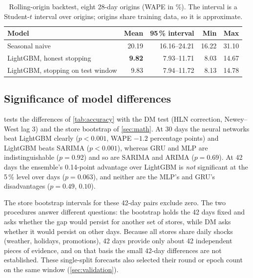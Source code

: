 \documentclass[conference]{IEEEtran}
\begin{document}
\begin{table}[t]
\centering
\caption{Rolling-origin backtest, eight 28-day origins (WAPE in \%). The interval is a Student-$t$
interval over origins; origins share training data, so it is approximate.}
\label{tab:backtest}
\scriptsize
\setlength{\tabcolsep}{3pt}
\begin{tabular}{@{}lrrrr@{}}
\toprule
Model & Mean & 95\,\% interval & Min & Max \\
\midrule
Seasonal naive & 20.19 & 16.16--24.21 & 16.22 & 31.10 \\
LightGBM, honest stopping & \textbf{9.82} & 7.93--11.71 & 8.03 & 14.67 \\
LightGBM, stopping on test window & 9.83 & 7.94--11.72 & 8.13 & 14.78 \\
\bottomrule
\end{tabular}
\end{table}

\subsection{Significance of model differences}\label{sec:results-significance}
 tests the differences of \cref{tab:accuracy} with the DM test (HLN correction,
Newey--West lag 3) and the store bootstrap of \cref{sec:math}. At 30 days the neural networks beat
LightGBM clearly ($p<0.001$, WAPE $-1.2$ percentage points) and LightGBM beats SARIMA ($p<0.001$),
whereas GRU and MLP are indistinguishable ($p=0.92$) and so are SARIMA and ARIMA ($p=0.69$). At 42
days the ensemble's 0.14-point advantage over LightGBM is \emph{not} significant at the 5\,\% level
over days ($p=0.063$), and neither are the MLP's and GRU's disadvantages ($p=0.49$, $0.10$).

The store bootstrap intervals for these 42-day pairs exclude zero. The two procedures answer
different questions: the bootstrap holds the 42 days fixed and asks whether the gap would persist
for another set of stores, while DM asks whether it would persist on other days. Because all stores
share daily shocks (weather, holidays, promotions), 42 days provide only about 42 independent pieces
of evidence, and on that basis the small 42-day differences are not established. These single-split
forecasts also selected their round or epoch count on the same window (\cref{sec:validation}).
\end{document}
